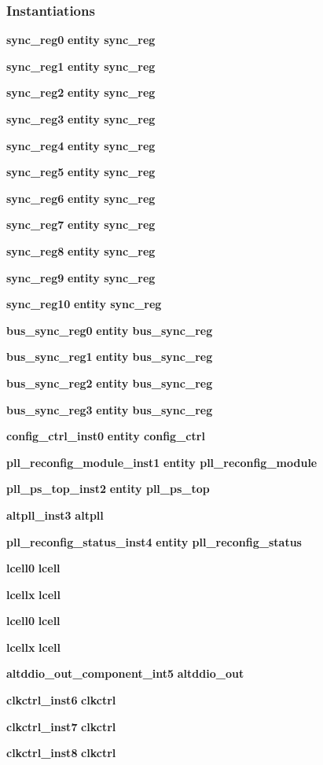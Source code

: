 \subsubsection*{Instantiations}
 \begin{DoxyCompactItemize}
\item 
{\bf sync\+\_\+reg0}  {\bfseries entity sync\+\_\+reg}   
\item 
{\bf sync\+\_\+reg1}  {\bfseries entity sync\+\_\+reg}   
\item 
{\bf sync\+\_\+reg2}  {\bfseries entity sync\+\_\+reg}   
\item 
{\bf sync\+\_\+reg3}  {\bfseries entity sync\+\_\+reg}   
\item 
{\bf sync\+\_\+reg4}  {\bfseries entity sync\+\_\+reg}   
\item 
{\bf sync\+\_\+reg5}  {\bfseries entity sync\+\_\+reg}   
\item 
{\bf sync\+\_\+reg6}  {\bfseries entity sync\+\_\+reg}   
\item 
{\bf sync\+\_\+reg7}  {\bfseries entity sync\+\_\+reg}   
\item 
{\bf sync\+\_\+reg8}  {\bfseries entity sync\+\_\+reg}   
\item 
{\bf sync\+\_\+reg9}  {\bfseries entity sync\+\_\+reg}   
\item 
{\bf sync\+\_\+reg10}  {\bfseries entity sync\+\_\+reg}   
\item 
{\bf bus\+\_\+sync\+\_\+reg0}  {\bfseries entity bus\+\_\+sync\+\_\+reg}   
\item 
{\bf bus\+\_\+sync\+\_\+reg1}  {\bfseries entity bus\+\_\+sync\+\_\+reg}   
\item 
{\bf bus\+\_\+sync\+\_\+reg2}  {\bfseries entity bus\+\_\+sync\+\_\+reg}   
\item 
{\bf bus\+\_\+sync\+\_\+reg3}  {\bfseries entity bus\+\_\+sync\+\_\+reg}   
\item 
{\bf config\+\_\+ctrl\+\_\+inst0}  {\bfseries entity config\+\_\+ctrl}   
\item 
{\bf pll\+\_\+reconfig\+\_\+module\+\_\+inst1}  {\bfseries entity pll\+\_\+reconfig\+\_\+module}   
\item 
{\bf pll\+\_\+ps\+\_\+top\+\_\+inst2}  {\bfseries entity pll\+\_\+ps\+\_\+top}   
\item 
{\bf altpll\+\_\+inst3}  {\bfseries altpll}   
\item 
{\bf pll\+\_\+reconfig\+\_\+status\+\_\+inst4}  {\bfseries entity pll\+\_\+reconfig\+\_\+status}   
\item 
{\bf lcell0}  {\bfseries lcell}   
\item 
{\bf lcellx}  {\bfseries lcell}   
\item 
{\bf lcell0}  {\bfseries lcell}   
\item 
{\bf lcellx}  {\bfseries lcell}   
\item 
{\bf altddio\+\_\+out\+\_\+component\+\_\+int5}  {\bfseries altddio\+\_\+out}   
\item 
{\bf clkctrl\+\_\+inst6}  {\bfseries clkctrl}   
\item 
{\bf clkctrl\+\_\+inst7}  {\bfseries clkctrl}   
\item 
{\bf clkctrl\+\_\+inst8}  {\bfseries clkctrl}   
\end{DoxyCompactItemize}


